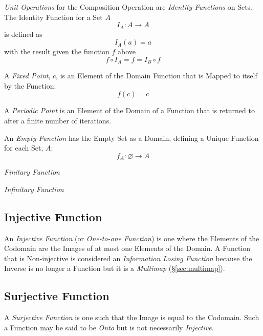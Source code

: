 \documentclass{article}
\begin{document}
\emph{Unit Operations} for the Composition Operation are
\emph{Identity Functions} on Sets. The Identity Function for a Set $A$
\[
    I_A : A \rightarrow A
\]
is defined as
\[
    I_A(a) = a
\]
with the result given the function $f$ above
\[
    f \circ I_A = f = I_B \circ f
\]

A \emph{Fixed Point}, $c$, is an Element of the Domain Function that
is Mapped to itself by the Function:
\[
    f(c) = c
\]

A \emph{Periodic Point} is an Element of the Domain of a Function that
is returned to after a finite number of iterations.

An \emph{Empty Function} has the Empty Set as a Domain, defining a
Unique Function for each Set, $A$:
\[
    f_A : \varnothing \rightarrow A
\]

\emph{Finitary Function}

\emph{Infinitary Function}



\subsection{Injective Function}\label{subsec:injective_function}

An \emph{Injective Function} (or \emph{One-to-one Function}) is one
where the Elements of the Codomain are the Images of at most one
Elements of the Domain. A Function that is Non-injective is considered
an \emph{Information Losing Function} because the Inverse is no longer
a Function but it is a \emph{Multimap} (\S\ref{sec:multimap}).



\subsection{Surjective Function}\label{subsec:surjective_function}

A \emph{Surjective Function} is one such that the Image is equal to
the Codomain. Such a Function may be said to be \emph{Onto} but is not
necessarily \emph{Injective}.



\end{document}
